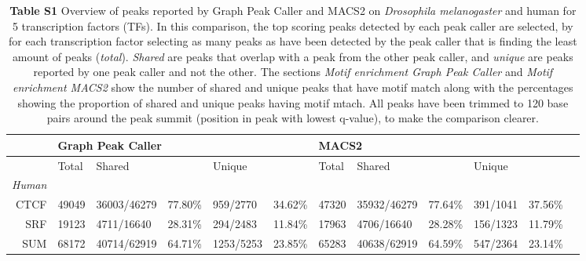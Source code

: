 \documentclass[a4paper,8pt]{article}
\title{}
\author{}
\begin{document}


\begin{table}[]
\begin{adjustwidth}{-1.45in}{0in} %
\centering
\caption*{\textbf{Table S1} Overview of peaks reported by Graph Peak Caller and MACS2 on \emph{Drosophila melanogaster} and human for 5 transcription factors (TFs).
  In this comparison, the top scoring peaks detected by each peak caller are selected, by for each transcription factor selecting as many peaks as have been detected by the peak caller that is finding the least amount of peaks (\emph{total}). 
  \emph{Shared} are peaks that overlap with a peak from the other peak caller, and \emph{unique} are peaks reported by one peak caller and not the other.
  The sections \emph{Motif enrichment Graph Peak Caller} and \emph{Motif enrichment MACS2} show the number of shared and unique peaks that have motif match along with the percentages showing the proportion of shared and unique peaks having motif mtach. All peaks have been trimmed to 120 base pairs around the peak summit (position in peak with lowest q-value), to make the comparison clearer.}
\label{table1}
\begin{tabular}{llllllllllll}
\toprule
 & \multicolumn{5}{l|}{Graph Peak Caller}                        & \multicolumn{5}{l}{MACS2}                       \\ \midrule
 &  \multicolumn{1}{|l}{Total} & \multicolumn{2}{l}{Shared} & \multicolumn{2}{l|}{Unique} & Total & \multicolumn{2}{l}{Shared} & \multicolumn{2}{l}{Unique} \\ \midrule
 
 \multicolumn{1}{l|}{\emph{Human}} & \multicolumn{10}{l}{} \\
 \multicolumn{1}{r|}{CTCF} & 49049 & 36003/46279 & 77.80\% & 959/2770 & 34.62\% & \multicolumn{1}{|l}{47320} & 35932/46279 & 77.64\% & 391/1041 & 37.56\% & \\ 
\multicolumn{1}{r|}{SRF} & 19123 & 4711/16640 & 28.31\% & 294/2483 & 11.84\% & \multicolumn{1}{|l}{17963} & 4706/16640 & 28.28\% & 156/1323 & 11.79\% & \\ 
\midrule\multicolumn{1}{r|}{SUM} & 68172 & 40714/62919 & 64.71\% & 1253/5253 & 23.85\% & \multicolumn{1}{|l}{65283} & 40638/62919 & 64.59\% & 547/2364 & 23.14\% & \\ 
 

\end{tabular}
\end{adjustwidth}
\end{table}
\end{document}
